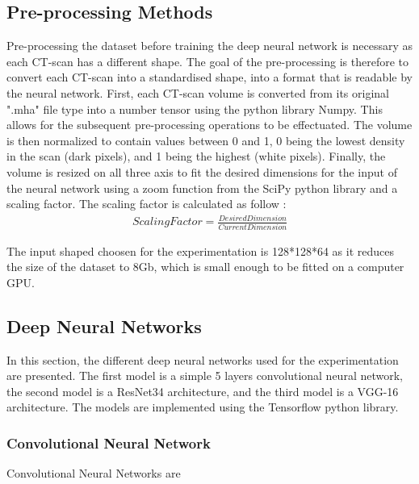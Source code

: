 \documentclass[12pt, letterpaper]{article}
\begin{document}
\subsection{Pre-processing Methods}

Pre-processing the dataset before training the deep neural network is necessary as each CT-scan has a different shape. The goal of the pre-processing is therefore to convert each CT-scan into a standardised shape, into a format that is readable by the neural network. First, each CT-scan volume is converted from its original ".mha" file type into a number tensor using the python library Numpy. This allows for the subsequent pre-processing operations to be effectuated. The volume is then normalized to contain values between 0 and 1, 0 being the lowest density in the scan (dark pixels), and 1 being the highest (white pixels). Finally, the volume is resized on all three axis to fit the desired dimensions for the input of the neural network using a zoom function from the SciPy python library and a scaling factor. The scaling factor is calculated as follow : \begin{align}
    Scaling Factor = \frac{Desired Dimension}{Current Dimension}
\end{align}

The input shaped choosen for the experimentation is 128*128*64 as it reduces the size of the dataset to 8Gb, which is small enough to be fitted on a computer GPU.


\subsection{Deep Neural Networks}
In this section, the different deep neural networks used for the experimentation are presented. The first model is a simple 5 layers convolutional neural network, the second model is a ResNet34 architecture, and the third model is a VGG-16 architecture. The models are implemented using the Tensorflow python library.
\subsubsection{Convolutional Neural Network}

Convolutional Neural Networks are 
\end{document}
